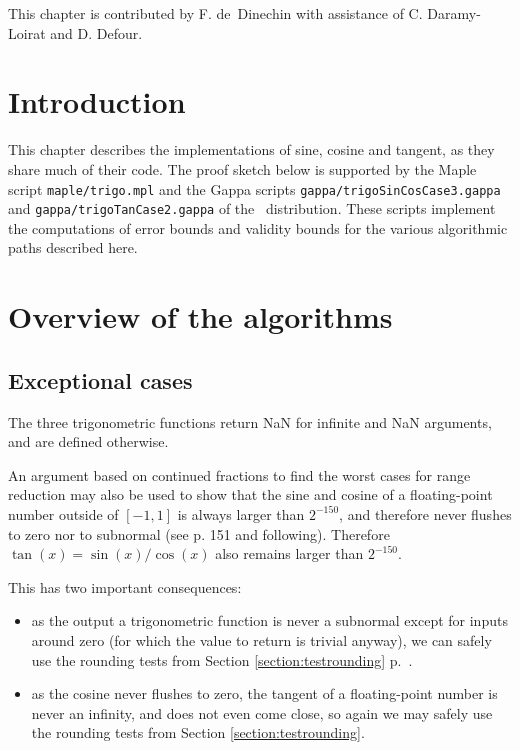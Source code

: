 This chapter is contributed by F. de~Dinechin with assistance of C.
Daramy-Loirat and D. Defour.

\section*{Introduction}
This chapter describes the implementations of sine, cosine and
tangent, as they share much of their code. The proof sketch below is
supported by the Maple script \texttt{maple/trigo.mpl} and the Gappa
scripts \texttt{gappa/trigoSinCosCase3.gappa} and
\texttt{gappa/trigoTanCase2.gappa} of the \crlibm\ distribution. These scripts
implement the computations of error bounds and validity bounds for the
various algorithmic paths described here.

\section{Overview of the algorithms}

\subsection{Exceptional cases}

The three trigonometric functions return NaN for infinite and NaN
arguments, and are defined otherwise.

An argument based on continued fractions to find the worst cases for
range reduction may also be used to show that the sine and cosine of a
floating-point number outside of $[-1,1]$ is always larger than
$2^{-150}$, and therefore never flushes to zero nor to subnormal (see
\cite{Muller97} p. 151 and following). Therefore
$\tan(x)=\sin(x)/\cos(x)$ also remains larger than $2^{-150}$.

This has two important consequences:

\begin{itemize}
\item as the output a trigonometric function is never a subnormal except for
  inputs around zero (for which the value to return is trivial
  anyway), we can safely use the rounding tests from Section
  \ref{section:testrounding} p.~\pageref{section:testrounding}.

\item as the cosine never flushes to zero, the tangent of a
  floating-point number is never an infinity, and does not even come
  close, so again we may safely use the rounding tests from Section
  \ref{section:testrounding}.
\end{itemize}

